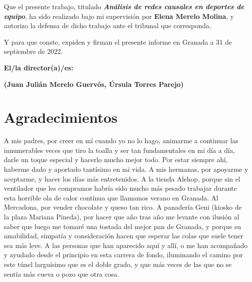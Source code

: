 Que el presente trabajo, titulado \textit{\textbf{Análisis de redes causales en deportes de equipo}},
ha sido realizado bajo mi supervisión por \textbf{Elena Merelo Molina}, y autorizo la defensa de dicho 
trabajo ante el tribunal que corresponda.

\vspace{0.5cm}

Y para que conste, expiden y firman el presente informe en Granada a 31 de septiembre de 2022.

\vspace{1cm}

\textbf{El/la director(a)/es: }

\vspace{5cm}

\noindent \textbf{(Juan Julián Merelo Guervós, Úrsula Torres Parejo)}

\chapter*{Agradecimientos}

A mis padres, por creer en mí cuando yo no lo hago, animarme a continuar las innumerables veces que tiro la 
toalla y ser tan fundamentales en mi día a día, darle un toque especial y hacerlo mucho mejor todo. Por estar 
siempre ahí, haberme dado y aportado tantísimo en mi vida. A mis hermanas, por apoyarme y aceptarme, y hacer los 
días más entretenidos. A la tienda Alehop, porque sin el ventilador que les compramos habría sido mucho 
más pesado trabajar durante esta horrible ola de calor contínua que llamamos verano en Granada. Al Mercadona, 
por vender chocolate y queso tan rico. A panadería Geni (kiosko de la plaza Mariana Pineda), por hacer que año tras 
año me levante con ilusión al saber que luego me tomaré una tostada del mejor pan de Granada, y porque su 
amabilidad, simpatía y consideración hacen que esperar las colas que suele tener sea más leve. A las personas 
que han aparecido aquí y allí, o me han acompañado y ayudado desde el principio en esta carrera de fondo, 
iluminando el camino por este túnel larguísimo que es el doble grado, y que más veces de las que no se 
sentía más cueva o pozo que otra cosa. 


